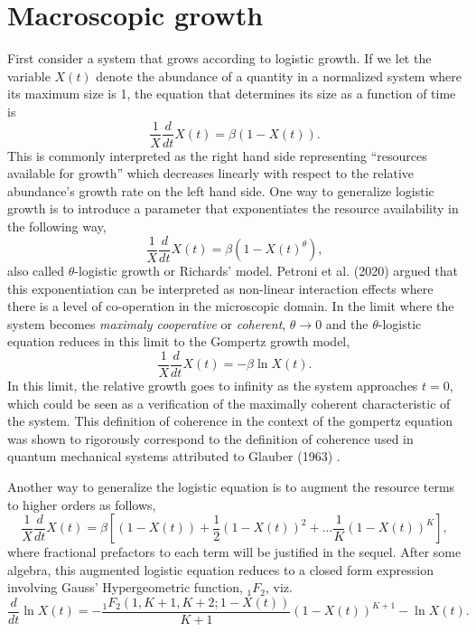 \documentclass{article}
\begin{document}
\section{Macroscopic growth}
\label{sec:macro}

First consider a system that grows according to logistic growth. If we let the variable $X(t)$ denote the abundance of a quantity in a normalized system where its maximum size is 1, the equation that determines its size as a function of time is
\begin{equation}
  \frac{1}{X}\frac{d}{dt} X(t) = \beta (1 - X(t)).
\end{equation}
This is commonly interpreted as the right hand side representing ``resources available for growth'' which decreases linearly with respect to the relative abundance's growth rate on the left hand side. One way to generalize logistic growth is to introduce a parameter that exponentiates the resource availability in the following way,
\begin{equation}
\label{eq:Rich}
  \frac{1}{X}\frac{d}{dt} X(t) = \beta (1 - X(t)^{\theta}),
\end{equation}
also called $\theta$-logistic growth or Richards' model. Petroni et al. (2020) argued that this exponentiation can be interpreted as non-linear interaction effects where there is a level of co-operation in the microscopic domain. In the limit where the system becomes \textit{maximaly cooperative} or \textit{coherent}, $\theta\rightarrow 0$ and the $\theta$-logistic equation reduces in this limit to the Gompertz growth model,
 \begin{equation}
 \label{eq:Gomp}
  \frac{1}{X}\frac{d}{dt} X(t) = - \beta \ln X(t).
\end{equation}
In this limit, the relative growth goes to infinity as the system approaches $t=0$, which could be seen as a verification of the maximally coherent characteristic of the system. This definition of coherence in the context of the gompertz equation was shown to rigorously correspond to the definition of coherence used in quantum mechanical systems \cite{molski2003coherent} attributed to Glauber (1963) \cite{glauber1963coherent}.

Another way to generalize the logistic equation is to augment the resource terms to higher orders as follows,
\begin{equation}
  \frac{1}{X}\frac{d}{dt} X(t) = \beta \left[(1 - X(t)) + \frac{1}{2}(1 - X(t))^2 + ... \frac{1}{K}(1 - X(t))^K\right],
\end{equation}
where fractional prefactors to each term will be justified in the sequel.
After some algebra, this augmented logistic equation reduces to a closed form expression involving Gauss' Hypergeometric function, ${}_1F_{2}$, viz.
\begin{equation}
 \label{eq:modLogistic}
\frac{d}{dt}\ln{X(t)} = - \frac{{}_{1}F_{2}({1,K+1,K+2;1-X(t)})}{K+1}(1-X(t))^{K+1} - \ln{X(t)}.
 \end{equation}
\end{document}
